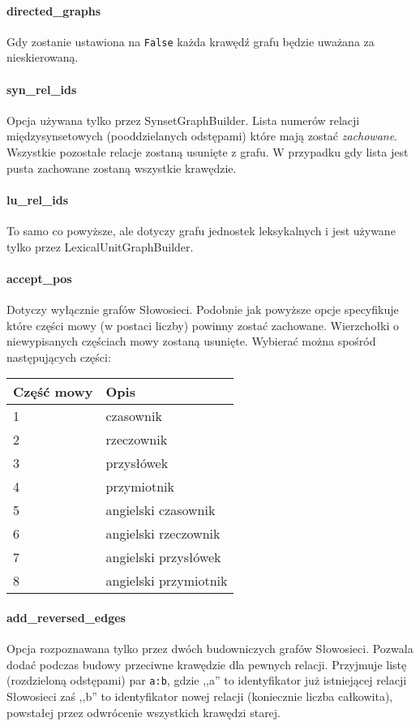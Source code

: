 \documentclass[10pt,a4paper]{article}
\begin{document}
\paragraph{directed\_graphs}
Gdy zostanie ustawiona na \texttt{False} każda krawędź grafu będzie uważana za nieskierowaną.

\paragraph{syn\_rel\_ids}
Opcja używana tylko przez SynsetGraphBuilder. Lista numerów relacji międzysynsetowych (pooddzielanych odstępami) które mają zostać \emph{zachowane}. Wszystkie pozostałe relacje zostaną usunięte z grafu. W przypadku gdy lista jest pusta zachowane zostaną wszystkie krawędzie. 

\paragraph{lu\_rel\_ids}
To samo co powyższe, ale dotyczy grafu jednostek leksykalnych i jest używane tylko przez LexicalUnitGraphBuilder.

\paragraph{accept\_pos}
Dotyczy wyłącznie grafów Słowosieci. Podobnie jak powyższe opcje specyfikuje które części mowy (w postaci liczby) powinny zostać zachowane. Wierzchołki o niewypisanych częściach mowy zostaną usunięte. Wybierać można spośród następujących części:

\begin{longtable}{l l}
\toprule
Część mowy & Opis \\
\midrule
1 & czasownik \\
2 & rzeczownik \\
3 & przysłówek \\
4 & przymiotnik \\
5 & angielski czasownik \\
6 & angielski rzeczownik \\
7 & angielski przysłówek \\
8 & angielski przymiotnik \\
\bottomrule
\end{longtable}

\paragraph{add\_reversed\_edges}
Opcja rozpoznawana tylko przez dwóch budowniczych grafów Słowosieci. Pozwala dodać podczas budowy przeciwne krawędzie dla pewnych relacji. Przyjmuje listę (rozdzieloną odstępami) par \texttt{a:b}, gdzie ,,a'' to identyfikator już istniejącej relacji Słowosieci zaś ,,b'' to identyfikator nowej relacji (koniecznie liczba całkowita), powstałej przez odwrócenie wszystkich krawędzi starej.
\end{document}
